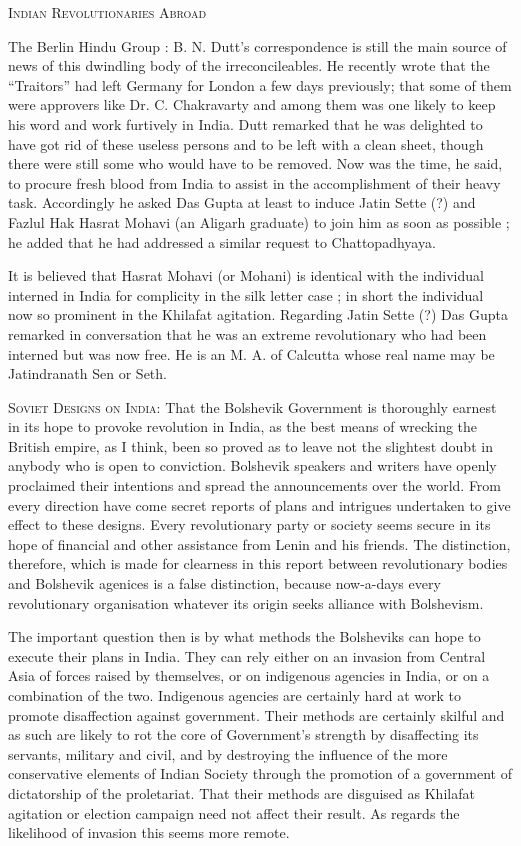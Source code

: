 \textsc{Indian Revolutionaries Abroad}

The Berlin Hindu Group : B. N. Dutt’s correspondence is still the main source of news of this dwindling body of the irreconcileables. He recently wrote that the “Traitors” had left Germany for London a few days previously; that some of them were approvers like Dr. C. Chakravarty and among them was one likely to keep his word and work furtively in India. Dutt remarked that he was delighted to have got rid of these useless persons and to be left with a clean sheet, though there were still some who would have to be removed. Now was the time, he said, to procure fresh blood from India to assist in the accomplishment of their heavy task. Accordingly he asked Das Gupta at least to induce Jatin Sette (?) and Fazlul Hak Hasrat Mohavi (an Aligarh graduate) to join him as soon as possible ; he added that he had addressed a similar request to Chattopadhyaya. 

It is believed that Hasrat Mohavi (or Mohani) is identical with the individual interned in India for complicity in the silk letter case ; in short the individual now so prominent in the Khilafat agitation. Regarding Jatin Sette (?) Das Gupta remarked in conversation that he was an extreme revolutionary who had been interned but was now free. He is an M. A. of Calcutta whose real name may be Jatindranath Sen or Seth. 

\textsc{Soviet Designs on India:} That the Bolshevik Government is thoroughly earnest in its hope to provoke revolution in India, as the best means of wrecking the British empire, as I think, been so proved as to leave not the slightest doubt in anybody who is open to conviction. Bolshevik speakers and writers have openly proclaimed their intentions and spread the announcements over the world. From every direction have come secret reports of plans and intrigues undertaken to give effect to these designs. Every revolutionary party or society seems secure in its hope of financial and other assistance from Lenin and his friends. The distinction, therefore, which is made for clearness in this report between revolutionary bodies and Bolshevik agenices is a false distinction, because now-a-days every revolutionary 
organisation whatever its origin seeks alliance with Bolshevism. 

The important question then is by what methods the Bolsheviks can hope to execute their plans in India. They can rely either on an invasion from Central Asia of forces raised by themselves, or on indigenous agencies in India, or on a combination of the two. Indigenous agencies are certainly hard at work to promote disaffection against government. Their methods are certainly skilful and as such are likely to rot the core of Government’s strength by disaffecting its servants, military and civil, and by destroying the influence of the more conservative elements of Indian Society through the promotion of a government of dictatorship of the proletariat. That their methods are disguised as Khilafat agitation or election campaign need not affect their result. As regards the likelihood of invasion this seems more remote. 

